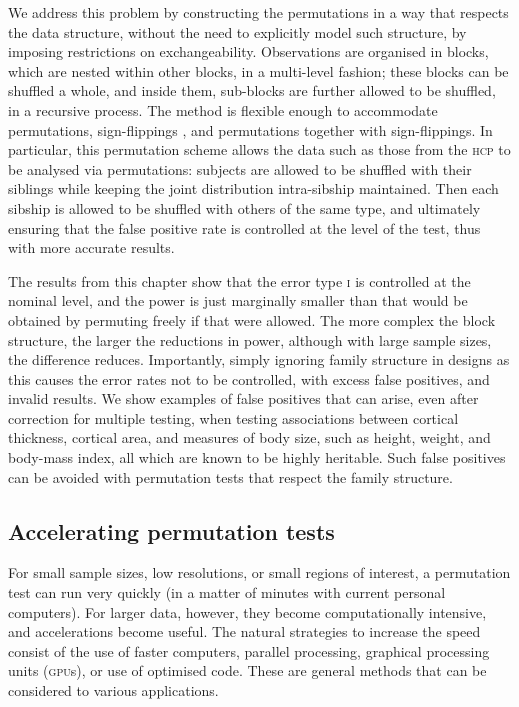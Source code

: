 We address this problem by constructing the permutations in a way that respects the data structure, without the need to explicitly model such structure, by imposing restrictions on exchangeability. Observations are organised in blocks, which are nested within other blocks, in a multi-level fashion; these blocks can be shuffled a whole, and inside them, sub-blocks are further allowed to be shuffled, in a recursive process. The method is flexible enough to accommodate permutations, sign-flippings \citep[sometimes also called ``wild bootstrap'';][]{Guillaume2014}, and permutations together with sign-flippings. In particular, this permutation scheme allows the data such as those from the \textsc{hcp} to be analysed via permutations: subjects are allowed to be shuffled with their siblings while keeping the joint distribution intra-sibship maintained. Then each sibship is allowed to be shuffled with others of the same type, and ultimately ensuring that the false positive rate is controlled at the level of the test, thus with more accurate results.

The results from this chapter show that the error type \textsc{i} is controlled at the nominal level, and the power is just marginally smaller than that would be obtained by permuting freely if that were allowed. The more complex the block structure, the larger the reductions in power, although with large sample sizes, the difference reduces. Importantly, simply ignoring family structure in designs as this causes the error rates not to be controlled, with excess false positives, and invalid results. We show examples of false positives that can arise, even after correction for multiple testing, when testing associations between cortical thickness, cortical area, and measures of body size, such as height, weight, and body-mass index, all which are known to be highly heritable. Such false positives can be avoided with permutation tests that respect the family structure.

\subsection{Accelerating permutation tests}

For small sample sizes, low resolutions, or small regions of interest, a permutation test can run very quickly (in a matter of minutes with current personal computers). For larger data, however, they become computationally intensive, and accelerations become useful. The natural strategies to increase the speed consist of the use of faster computers, parallel processing, graphical processing units (\textsc{gpu}s), or use of optimised code. These are general methods that can be considered to various applications.

